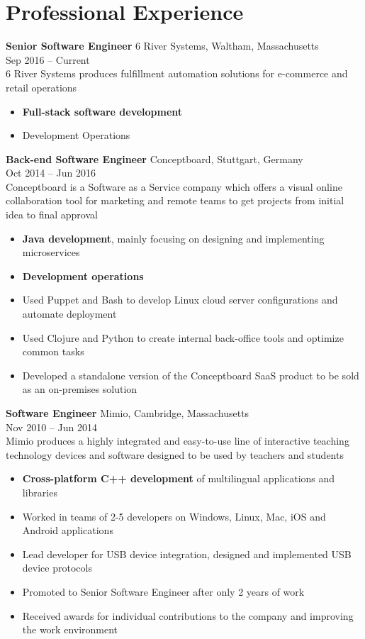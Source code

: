 \documentclass{article}
\begin{document}
\section*{Professional Experience}
{\bf Senior Software Engineer} 6 River Systems, Waltham, Massachusetts\\
Sep 2016 -- Current\\
6 River Systems produces fulfillment automation solutions for e-commerce and retail operations
\begin{itemize}
  \itemsep0em
  \item {\bf Full-stack software development}
  \item Development Operations
\end{itemize}
{\bf Back-end Software Engineer} Conceptboard, Stuttgart, Germany\\
Oct 2014 -- Jun 2016\\
Conceptboard is a Software as a Service company which offers a visual online collaboration tool for marketing and remote teams to get projects from initial idea to final approval
\begin{itemize}
  \itemsep0em
  \item {\bf Java development}, mainly focusing on designing and implementing microservices
  \item {\bf Development operations}
  \item Used Puppet and Bash to develop Linux cloud server configurations and automate deployment
  \item Used Clojure and Python to create internal back-office tools and optimize common tasks
  \item Developed a standalone version of the Conceptboard SaaS product to be sold as an on-premises solution
\end{itemize}
{\bf Software Engineer} Mimio, Cambridge, Massachusetts\\
Nov 2010 -- Jun 2014\\
Mimio produces a highly integrated and easy-to-use line of interactive teaching technology devices and software designed to be used by teachers and students
\begin{itemize}
  \itemsep0em
  \item {\bf Cross-platform C++ development} of multilingual applications and libraries
  \item Worked in teams of 2-5 developers on Windows, Linux, Mac, iOS and Android applications
  \item Lead developer for USB device integration, designed and implemented USB device protocols
  \item Promoted to Senior Software Engineer after only 2 years of work
  \item Received awards for individual contributions to the company and improving the work environment\\
\end{itemize}
\end{document}
